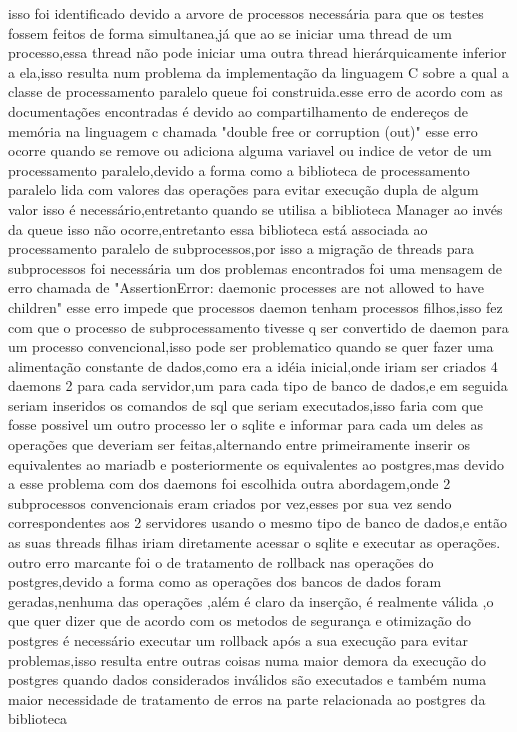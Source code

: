 \documentclass[
	12pt,				%
	openright,			%
	oneside,			%
	a4paper,			%
	english,			%
	french,				%
	spanish,			%
	brazil,				%
	]{abntex2}
\begin{document}
isso foi identificado devido a arvore de processos necessária para que os testes fossem feitos de forma simultanea,já que ao se iniciar uma thread de um processo,essa thread não pode iniciar uma outra thread hierárquicamente inferior a ela,isso resulta num problema da implementação da linguagem C sobre a qual a classe de processamento paralelo queue foi construida.esse erro de acordo com as documentações encontradas é devido ao compartilhamento de endereços de memória na linguagem c chamada "double free or corruption (out)" esse erro ocorre quando se remove ou adiciona alguma variavel ou indice de vetor de um processamento paralelo,devido a forma como a biblioteca de processamento paralelo lida com valores das operações para evitar execução dupla de algum valor isso é necessário,entretanto quando se utilisa a biblioteca Manager ao invés da queue isso não ocorre,entretanto essa biblioteca está associada ao processamento paralelo de subprocessos,por isso a migração de threads para subprocessos foi necessária\newline
um dos problemas encontrados foi uma mensagem de erro chamada de "AssertionError: daemonic processes are not allowed to have children" esse erro impede que processos daemon tenham processos filhos,isso fez com que o processo de subprocessamento tivesse q ser convertido de daemon para um processo convencional,isso pode ser problematico quando se quer fazer uma alimentação constante de dados,como era a idéia inicial,onde iriam ser criados 4 daemons 2 para cada servidor,um para cada tipo de banco de dados,e em seguida seriam inseridos os comandos de sql que seriam executados,isso faria com que fosse possivel um outro processo ler o sqlite e informar para cada um deles as operações que deveriam ser feitas,alternando entre primeiramente inserir os equivalentes ao mariadb e posteriormente os equivalentes ao postgres,mas devido a esse problema com dos daemons foi escolhida outra abordagem,onde 2 subprocessos convencionais eram criados por vez,esses por sua vez sendo correspondentes aos 2 servidores usando o mesmo tipo de banco de dados,e então as suas threads filhas iriam diretamente acessar o sqlite e executar as operações.\newline
outro erro marcante foi o de tratamento de rollback nas operações do postgres,devido a forma como as operações dos bancos de dados foram geradas,nenhuma das operações ,além é claro da inserção, é realmente válida ,o que quer dizer que de acordo com os metodos de segurança e otimização do postgres é necessário executar um rollback após a sua execução para evitar problemas,isso resulta entre outras coisas numa maior demora da execução do postgres quando dados considerados inválidos são executados e também numa maior necessidade de tratamento de erros na parte relacionada ao postgres da biblioteca 
\end{document}
